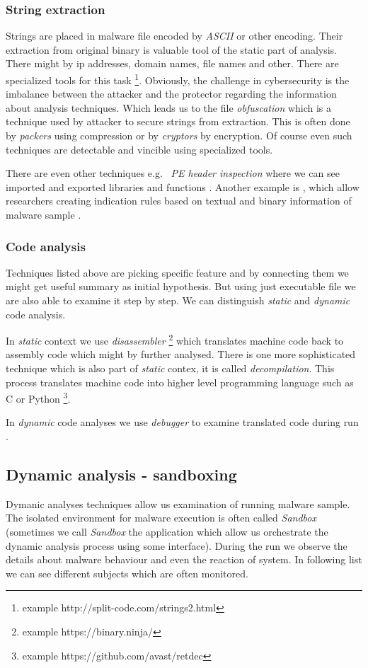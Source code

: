 \subsubsection{String extraction}
Strings are placed in malware file encoded by \emph{ASCII} or other encoding. Their extraction from original binary is valuable tool of the static part of analysis. There might by ip addresses, domain names, file names and other. There are specialized tools for this task \footnote{example http://split-code.com/strings2.html}. Obviously, the challenge in cybersecurity is the imbalance between the attacker and the protector regarding the information about analysis techniques. Which leads us to the file \emph{obfuscation} which is a technique used by attacker to secure strings from extraction. This is often done by \emph{packers} using compression or by \emph{cryptors} by encryption. Of course even such techniques are detectable and vincible using specialized tools.

There are even other techniques e.g. \ \emph{PE header inspection} where we can see imported and exported libraries and functions \cite{Sikorski2012}. Another example is , which allow researchers creating indication rules based on textual and binary information of malware sample \cite{KA2018}.

\subsubsection{Code analysis}
Techniques listed above are picking specific feature and by connecting them we might get useful summary as initial hypothesis. But using just executable file we are also able to examine it step by step. We can distinguish \emph{static} and \emph{dynamic} code analysis.

In \emph{static} context we use \emph{disassembler} \footnote{example https://binary.ninja/} which translates machine code back to assembly code which might by further analysed. There is one more sophisticated technique which is also part of \emph{static} contex, it is called \emph{decompilation}. This process translates machine code into higher level programming language such as C or Python \footnote{example https://github.com/avast/retdec}.

In \emph{dynamic} code analyses we use \emph{debugger} to examine translated code during run \cite{KA2018}.

\subsection{Dynamic analysis - sandboxing}
Dymanic analyses techniques allow us examination of running malware sample. The isolated environment for malware execution is often called \emph{Sandbox} (sometimes we call \emph{Sandbox} the application which allow us orchestrate the dynamic analysis process using some interface). During the run we observe the details about malware behaviour and even the reaction of system. In following list we can see different subjects which are often monitored.


